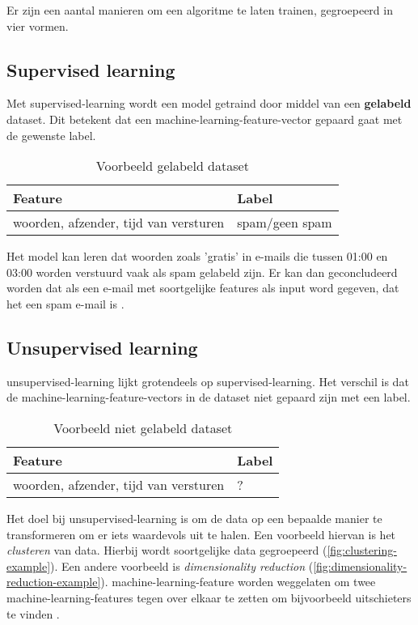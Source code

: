 Er zijn een aantal manieren om een algoritme te laten trainen, gegroepeerd in vier vormen.

\subsection{Supervised learning}\label{subsec:supervised-learning}
Met \gls{supervised-learning} wordt een model getraind door middel van een \textbf{gelabeld} dataset. Dit betekent dat een \gls{machine-learning-feature-vector} gepaard gaat met de gewenste label.

\begin{table}[hbt!]
  \centering
  \begin{tabular}{|l|l|}
  \hline
  \textbf{Feature} & \textbf{Label} \\ \hline
  woorden, afzender, tijd van versturen&spam/geen spam\\ \hline
  \end{tabular}
  \caption{Voorbeeld gelabeld dataset}
  \label{table:voorbeeld-gelabeld-dataset}
\end{table}

Het model kan leren dat woorden zoals 'gratis' in e-mails die tussen 01:00 en 03:00 worden verstuurd vaak als spam gelabeld zijn. Er kan dan geconcludeerd worden dat als een e-mail met soortgelijke features als input word gegeven, dat het een spam e-mail is \cite{google-ml-terminology}.

\subsection{Unsupervised learning}\label{subsec:unsupervised-learning}
\Gls{unsupervised-learning} lijkt grotendeels op \gls{supervised-learning}. Het verschil is dat de \glspl{machine-learning-feature-vector} in de dataset niet gepaard zijn met een label. 

\begin{table}[hbt!]
  \centering
  \begin{tabular}{|l|l|}
  \hline
  \textbf{Feature} & \textbf{Label} \\ \hline
  woorden, afzender, tijd van versturen&?\\ \hline
  \end{tabular}
  \caption{Voorbeeld niet gelabeld dataset}
  \label{table:voorbeeld-niet-gelabeld-dataset}
\end{table}

Het doel bij \gls{unsupervised-learning} is om de data op een bepaalde manier te transformeren om er iets waardevols uit te halen. Een voorbeeld hiervan is het \textit{clusteren} van data. Hierbij wordt soortgelijke data gegroepeerd (\autoref{fig:clustering-example}). Een andere voorbeeld is \textit{dimensionality reduction} (\autoref{fig:dimensionality-reduction-example}). \Gls{machine-learning-feature} worden weggelaten om twee \glspl{machine-learning-feature} tegen over elkaar te zetten om bijvoorbeeld uitschieters te vinden \cite{the-hundred-page-machine-learning-book}.

